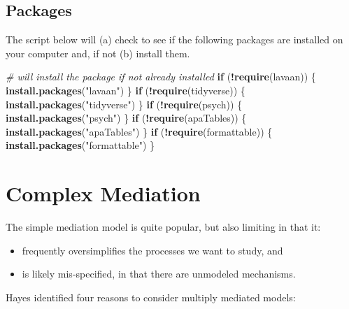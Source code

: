 \documentclass[
  11pt,
]{book}
\newenvironment{Shaded}{\begin{snugshade}}{\end{snugshade}}
\newcommand{\CommentTok}[1]{\textcolor[rgb]{0.37,0.37,0.37}{\textit{#1}}}
\newcommand{\ControlFlowTok}[1]{\textcolor[rgb]{0.27,0.27,0.27}{\textbf{#1}}}
\newcommand{\FunctionTok}[1]{\textcolor[rgb]{0.27,0.27,0.27}{\textbf{#1}}}
\newcommand{\NormalTok}[1]{#1}
\newcommand{\SpecialCharTok}[1]{\textcolor[rgb]{0.43,0.43,0.43}{\textbf{#1}}}
\newcommand{\StringTok}[1]{\textcolor[rgb]{0.5,0.5,0.5}{#1}}
\providecommand{\tightlist}{%
  \setlength{\itemsep}{0pt}\setlength{\parskip}{0pt}}
\begin{document}
\hypertarget{packages-5}{%
\subsection{Packages}\label{packages-5}}

The script below will (a) check to see if the following packages are installed on your computer and, if not (b) install them.

\begin{Shaded}
\begin{Highlighting}[]
\CommentTok{\# will install the package if not already installed}
\ControlFlowTok{if}\NormalTok{ (}\SpecialCharTok{!}\FunctionTok{require}\NormalTok{(lavaan)) \{}
    \FunctionTok{install.packages}\NormalTok{(}\StringTok{"lavaan"}\NormalTok{)}
\NormalTok{\}}
\ControlFlowTok{if}\NormalTok{ (}\SpecialCharTok{!}\FunctionTok{require}\NormalTok{(tidyverse)) \{}
    \FunctionTok{install.packages}\NormalTok{(}\StringTok{"tidyverse"}\NormalTok{)}
\NormalTok{\}}
\ControlFlowTok{if}\NormalTok{ (}\SpecialCharTok{!}\FunctionTok{require}\NormalTok{(psych)) \{}
    \FunctionTok{install.packages}\NormalTok{(}\StringTok{"psych"}\NormalTok{)}
\NormalTok{\}}
\ControlFlowTok{if}\NormalTok{ (}\SpecialCharTok{!}\FunctionTok{require}\NormalTok{(apaTables)) \{}
    \FunctionTok{install.packages}\NormalTok{(}\StringTok{"apaTables"}\NormalTok{)}
\NormalTok{\}}
\ControlFlowTok{if}\NormalTok{ (}\SpecialCharTok{!}\FunctionTok{require}\NormalTok{(formattable)) \{}
    \FunctionTok{install.packages}\NormalTok{(}\StringTok{"formattable"}\NormalTok{)}
\NormalTok{\}}
\end{Highlighting}
\end{Shaded}

\hypertarget{complex-mediation}{%
\section{Complex Mediation}\label{complex-mediation}}

The simple mediation model is quite popular, but also limiting in that it:

\begin{itemize}
\tightlist
\item
  frequently oversimplifies the processes we want to study, and
\item
  is likely mis-specified, in that there are unmodeled mechanisms.
\end{itemize}

Hayes \citeyearpar{hayes_more_2022} identified four reasons to consider multiply mediated models:
\end{document}
